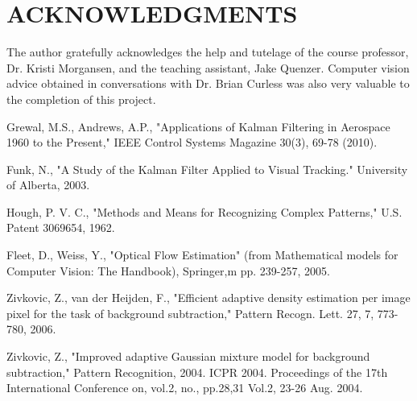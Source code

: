 \documentclass[letterpaper, 10 pt, conference]{ieeeconf}  %
\begin{document}
\section{ACKNOWLEDGMENTS}

The author gratefully acknowledges the help and tutelage of the course professor, Dr. Kristi Morgansen, and the teaching assistant, Jake Quenzer. Computer vision advice obtained in conversations with Dr. Brian Curless was also very valuable to the completion of this project.


\begin{thebibliography}{99}

Grewal, M.S., Andrews, A.P., "Applications of Kalman Filtering in Aerospace 1960 to the Present," IEEE Control Systems Magazine 30(3), 69-78 (2010).

Funk, N., "A Study of the Kalman Filter Applied to Visual Tracking." University of Alberta, 2003.

Hough, P. V. C., "Methods and Means for Recognizing Complex Patterns," U.S. Patent 3069654, 1962.

Fleet, D., Weiss, Y., "Optical Flow Estimation" (from Mathematical models for Computer Vision: The Handbook), Springer,m pp. 239-257, 2005.

Zivkovic, Z., van der Heijden, F., "Efficient adaptive density estimation per image pixel for the task of background subtraction," Pattern Recogn. Lett. 27, 7, 773-780, 2006.

Zivkovic, Z., "Improved adaptive Gaussian mixture model for background subtraction," Pattern Recognition, 2004. ICPR 2004. Proceedings of the 17th International Conference on, vol.2, no., pp.28,31 Vol.2, 23-26 Aug. 2004.

\end{thebibliography}
\end{document}
